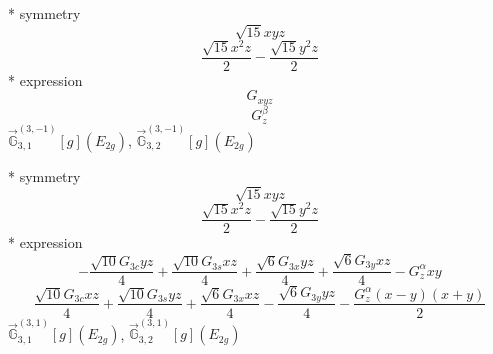 \documentclass[fleqn,8pt]{jsarticle}
\begin{document}
\noindent\quad ** symmetry
\begin{dmath*}
\sqrt{15} x y z
\end{dmath*}
\begin{dmath*}
\frac{\sqrt{15} x^{2} z}{2} - \frac{\sqrt{15} y^{2} z}{2}
\end{dmath*}
\noindent\quad ** expression
\begin{dmath*}
G_{xyz}
\end{dmath*}
\begin{dmath*}
G_{z}^{\beta}
\end{dmath*}
\noindent\quad $\vec{\mathbb{G}}_{3,1}^{(3,-1)}[g](E_{2g})$, $\vec{\mathbb{G}}_{3,2}^{(3,-1)}[g](E_{2g})$

\noindent\quad ** symmetry
\begin{dmath*}
\sqrt{15} x y z
\end{dmath*}
\begin{dmath*}
\frac{\sqrt{15} x^{2} z}{2} - \frac{\sqrt{15} y^{2} z}{2}
\end{dmath*}
\noindent\quad ** expression
\begin{dmath*}
- \frac{\sqrt{10} G_{3c} y z}{4} + \frac{\sqrt{10} G_{3s} x z}{4} + \frac{\sqrt{6} G_{3x} y z}{4} + \frac{\sqrt{6} G_{3y} x z}{4} - G_{z}^{\alpha} x y
\end{dmath*}
\begin{dmath*}
\frac{\sqrt{10} G_{3c} x z}{4} + \frac{\sqrt{10} G_{3s} y z}{4} + \frac{\sqrt{6} G_{3x} x z}{4} - \frac{\sqrt{6} G_{3y} y z}{4} - \frac{G_{z}^{\alpha} \left(x - y\right) \left(x + y\right)}{2}
\end{dmath*}
\noindent\quad $\vec{\mathbb{G}}_{3,1}^{(3,1)}[g](E_{2g})$, $\vec{\mathbb{G}}_{3,2}^{(3,1)}[g](E_{2g})$
\end{document}
